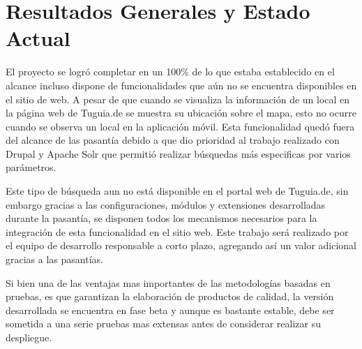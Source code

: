 \section{Resultados Generales y Estado Actual}

El proyecto se logró completar en un 100\% de lo que estaba establecido en el alcance incluso dispone de funcionalidades que aún no se encuentra disponibles en el sitio de web. A pesar de que cuando se visualiza la información de un local en la página web de Tuguia.de se muestra su ubicación sobre el mapa, esto no ocurre cuando se observa un local en la aplicación móvil. Esta funcionalidad quedó fuera del alcance de las pasantía debido a que dio prioridad al trabajo realizado con Drupal y Apache Solr que permitió realizar búsquedas más especificas por varios parámetros. 

Este tipo de búsqueda aun no está disponible en el portal web de Tuguia.de, sin embargo gracias a las configuraciones, módulos y extensiones desarrolladas durante la pasantía, se disponen todos los mecanismos necesarios para la integración de esta funcionalidad en el sitio web. Este trabajo será realizado por el equipo de desarrollo responsable a corto plazo, agregando así un valor adicional gracias a las pasantías.

Si bien una de las ventajas mas importantes de las metodologías basadas en pruebas, es que garantizan la elaboración de productos de calidad, la versión desarrollada se encuentra en fase beta y aunque es bastante estable, debe ser sometida a una serie pruebas mas extensas antes de considerar realizar su despliegue.